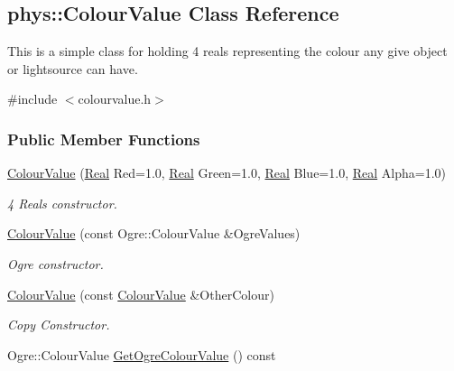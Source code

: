 \hypertarget{classphys_1_1ColourValue}{
\subsection{phys::ColourValue Class Reference}
\label{classphys_1_1ColourValue}
}


This is a simple class for holding 4 reals representing the colour any give object or lightsource can have.  




{\ttfamily \#include $<$colourvalue.h$>$}

\subsubsection*{Public Member Functions}
\begin{DoxyCompactItemize}
\item 
\hyperlink{classphys_1_1ColourValue_aee4faa554b444fe927fa292a794fe74a}{ColourValue} (\hyperlink{namespacephys_af7eb897198d265b8e868f45240230d5f}{Real} Red=1.0, \hyperlink{namespacephys_af7eb897198d265b8e868f45240230d5f}{Real} Green=1.0, \hyperlink{namespacephys_af7eb897198d265b8e868f45240230d5f}{Real} Blue=1.0, \hyperlink{namespacephys_af7eb897198d265b8e868f45240230d5f}{Real} Alpha=1.0)
\begin{DoxyCompactList}\small\item\em 4 Reals constructor. \item\end{DoxyCompactList}\item 
\hyperlink{classphys_1_1ColourValue_ac814df9f1709186fa6aeadbca8e0ed9f}{ColourValue} (const Ogre::ColourValue \&OgreValues)
\begin{DoxyCompactList}\small\item\em Ogre constructor. \item\end{DoxyCompactList}\item 
\hyperlink{classphys_1_1ColourValue_add6b3ac7e9809dce240cd584b94e8c67}{ColourValue} (const \hyperlink{classphys_1_1ColourValue}{ColourValue} \&OtherColour)
\begin{DoxyCompactList}\small\item\em Copy Constructor. \item\end{DoxyCompactList}\item 
Ogre::ColourValue \hyperlink{classphys_1_1ColourValue_a025ed32506fe3df9e360dc00f3fb4898}{GetOgreColourValue} () const 

\end{DoxyCompactItemize}
